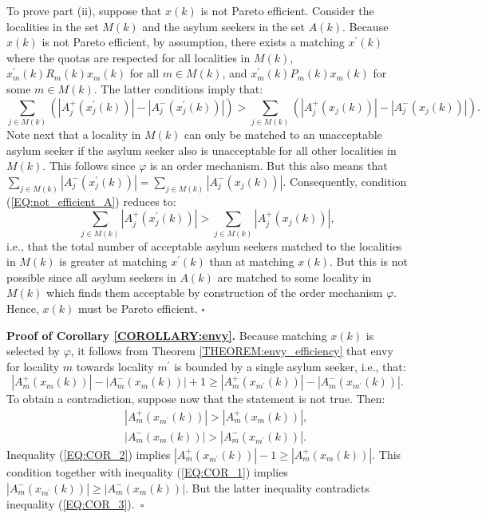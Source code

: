 \documentclass[12pt,fleqn]{article}
\begin{document}
To prove part (ii), suppose that $x(k)$ is not Pareto efficient. Consider the localities in the set $M(k)$ and the asylum seekers in the set $A(k)$. Because $x(k)$ is not Pareto efficient, by assumption, there exists a matching $x^\prime(k)$ where the quotas are respected for all localities in $M(k)$, $x_m^\prime(k)R_m(k) x_m(k)$ for all $m\in M(k)$, and $x_m^\prime(k)P_m(k) x_m(k)$ for some $m\in M(k)$. The latter conditions imply that:
\begin{equation}
\sum_{j\in M(k)}\left(|A_j^+(x_j^\prime(k))|-|A_j^-(x_j^\prime(k))|\right)>\sum_{j\in M(k)}\left(|A_j^+({x_j}(k))|-|A_j^-({x_j}(k))|\right).\label{EQ:not_efficient_A}
\end{equation}
\noindent Note next that a locality in $M(k)$ can only be matched to an unacceptable asylum seeker if the asylum seeker also is unacceptable for all other localities in $M(k)$. This follows since $\varphi$ is an order mechanism. But this also means that $\sum_{j\in M(k)}|A_j^-(x_j^\prime(k))|=\sum_{j\in M(k)}|A_j^-({x_j}(k))|$. Consequently, condition (\ref{EQ:not_efficient_A}) reduces to:
\begin{equation}
\sum_{j\in M(k)}|A_j^+(x_j^\prime(k))|>\sum_{j\in M(k)}|A_j^+({x_j}(k))|,\label{EQ:not_efficient_B}
\end{equation}
\noindent i.e., that the total number of acceptable asylum seekers matched to the localities in $M(k)$ is greater at matching $x^\prime(k)$ than at matching $x(k)$. But this is not possible since all asylum seekers in $A(k)$ are matched to some locality in $M(k)$ which finds them acceptable by construction of the order mechanism $\varphi$. Hence, $x(k)$ must be Pareto efficient. \hfill $\square$

\medskip

\noindent\textbf{Proof of Corollary \ref{COROLLARY:envy}.} Because matching $x(k)$ is selected by $\varphi$, it follows from Theorem \ref{THEOREM:envy_efficiency} that envy for locality $m$ towards locality $m^\prime$ is bounded by a single asylum seeker, i.e., that:
\begin{equation}
|A_m^+(x_m(k))|-|A_m^-(x_m(k))|+1\geq |A_m^+(x_{m^\prime}(k))|-|A_m^-(x_{m^\prime}(k))|.\label{EQ:COR_1}
\end{equation}
\noindent To obtain a contradiction, suppose now that the statement is not true. Then:
\begin{eqnarray}
&& |A_m^+(x_{m^\prime}(k))|>|A_m^+(x_m(k))|,\label{EQ:COR_2} \\
&& |A_m^-(x_m(k))|>|A_m^-(x_{m^\prime}(k))|.\label{EQ:COR_3}
\end{eqnarray}
\noindent Inequality (\ref{EQ:COR_2}) implies $|A_m^+(x_{m^\prime}(k))|-1\geq |A_m^+(x_m(k))|$. This condition together with inequality (\ref{EQ:COR_1}) implies $|A_m^-(x_{m^\prime}(k))|\geq |A_m^-(x_m(k))|$. But the latter inequality contradicts inequality (\ref{EQ:COR_3}).~\hfill$\square$
\end{document}
